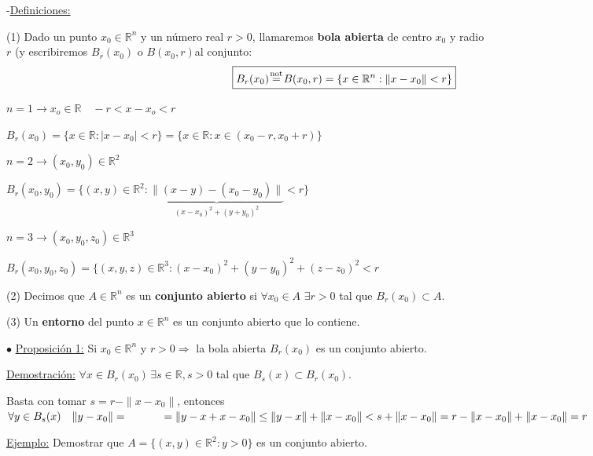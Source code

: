 \documentclass[10pt, titlepage]{article}
\newcommand{\eqc}[1]{\stackrel{\mathclap{\normalfont\mbox{\scriptsize{#1}}}}{=}}
\newcommand{\R}{\mathbb{R}}
\newcommand{\proposicion}[1][\!\!]{\noindent$\bullet$ \underline{Proposición #1:} }
\newcommand{\dindent}{\indent\indent}
\begin{document}
-\underline{Definiciones:}
\vspace{5mm}

(1) Dado un punto $x_0 \in \mathbb{R}^n$ y un número real $r>0$, llamaremos \textbf{bola abierta} de 
centro $x_0$ y radio \\ \indent $r$ (y escribiremos $B_r (x_0) $ o $B(x_0, r)$al conjunto:
\[
\boxed{
B_r (x_0)  \eqc{not} B(x_0, r) = \{ x \in \mathbb{R}^n : \|x-x_0\|<r\}
}
\]
\vspace{3mm}

$n=1 \rightarrow x_o \in \mathbb{R} \quad -r<x-x_o<r$

$B_r(x_0) = \{ x \in \mathbb{R} : |x-x_0| <r\} = \{ x \in \mathbb{R} : x \in (x_0-r, x_0+r) \}$
\vspace{5mm}

$n=2 \rightarrow (x_0, y_0) \in \mathbb{R}^2$

$B_r (x_0, y_0) = \{ (x, y) \in \mathbb{R}^2 : \underbrace{\|(x-y) - (x_0 - y_0) \|}_{(x-x_0)^2 + (y + 
y_0)^2} < r\}$

$n=3 \rightarrow (x_0, y_0, z_0) \in \mathbb{R}^3$

$B_r (x_0, y_0, z_0) = \{ (x, y, z) \in \mathbb{R}^3 : (x-x_0)^2 + (y - y_0)^2 + (z - z_0)^2 < r$
\vspace{5mm}

(2) Decimos que $A \in \mathbb{R}^n$ es un \textbf{conjunto abierto} si $\forall x_0 \in A \, \, \exists r>0$ tal que $B_r (x_0) \subset A$.
\vspace{5mm}

(3) Un \textbf{entorno} del punto $x \in \mathbb{R}^n$ es un conjunto abierto que lo contiene.
\vspace{7mm}


\proposicion[1] Si $x_0 \in \mathbb{R}^n$ y $r>0 \Rightarrow$ la bola abierta $B_r(x_0)$ es un conjunto abierto.
\vspace{5mm}

\indent \underline{Demostración:} $\forall x \in B_r(x_0) \, \exists s \in \R , s>0$ tal que $B_s(x) \subset B_r(x_0)$.
\vspace{3mm}

\dindent Basta con tomar $s = r - \|x-x_0\|$, entonces $\forall y \in B_s(x) \quad \|y - x_0\| = \\
\dindent = \|y -x +x -x_0\| \leq \|y-x\| + \|x - x_0\| < s + \|x - x_0\| = r - \|x - x_0\| + \|x - x_0\| = r$
\vspace{5mm}

\underline{Ejemplo:} Demostrar que $A = \{ (x, y) \in \R^2 : y>0\}$ es un conjunto abierto.
\vspace{3mm}
\end{document}
